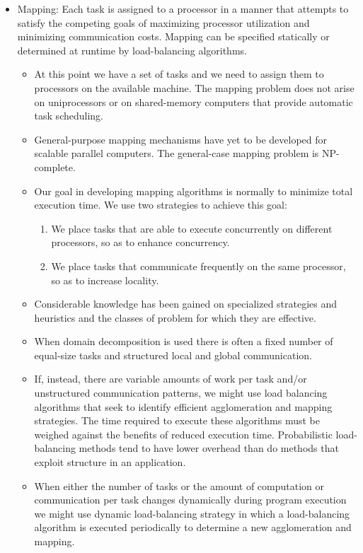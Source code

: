 \documentclass[paper=a4, fontsize=11pt]{scrartcl} %
\numberwithin{equation}{section} %
\numberwithin{figure}{section} %
\numberwithin{table}{section} %
\begin{document}
\begin{itemize}
\begin{itemize}
\begin{itemize}
\begin{itemize}
      \end{itemize}
    \end{itemize}
    \item Mapping: Each task is assigned to a processor in a manner that attempts to satisfy the competing goals of maximizing processor utilization and minimizing communication costs. Mapping can be specified statically or determined at runtime by load-balancing algorithms.
    \begin{itemize}
      \item At this point we have a set of tasks and we need to assign them to processors on the available machine. The mapping problem does not arise on uniprocessors or on shared-memory computers that provide automatic task scheduling.
      \item General-purpose mapping mechanisms have yet to be developed for scalable parallel computers. The general-case mapping problem is NP-complete.
      \item Our goal in developing mapping algorithms is normally to minimize total execution time. We use two strategies to achieve this goal:
      \begin{enumerate}
        \item We place tasks that are able to execute concurrently on different processors, so as to enhance concurrency.
        \item We place tasks that communicate frequently on the same processor, so as to increase locality.
      \end{enumerate}
      \item Considerable knowledge has been gained on specialized strategies and heuristics and the classes of problem for which they are effective.
      \item When domain decomposition is used there is often a fixed number of equal-size tasks and structured local and global communication.
      \item If, instead, there are variable amounts of work per task and/or unstructured communication patterns, we might use load balancing algorithms that seek to identify efficient agglomeration and mapping strategies. The time required to execute these algorithms must be weighed against the benefits of reduced execution time. Probabilistic load-balancing methods tend to have lower overhead than do methods that exploit structure in an application.
      \item When either the number of tasks or the amount of computation or communication per task changes dynamically during program execution we might use dynamic load-balancing strategy in which a load-balancing algorithm is executed periodically to determine a new agglomeration and mapping.

\end{itemize}
\end{itemize}
\end{itemize}
\end{document}
